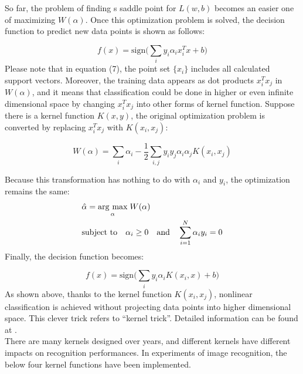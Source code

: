   \noindent So far, the problem of finding s saddle point for $L(w, b)$ becomes an easier one of maximizing $W(\alpha)$. Once this optimization problem is solved, the decision function to predict new data points is shown as follows:

  \begin{equation}
  f(x) = \text{sign}\bigg(\sum_i y_i \alpha_i x_i^T x + b\bigg)
  \end{equation}
  Please note that in equation (7), the point set $\{x_i\}$ includes all calculated support vectors. Moreover, the training data appears as dot products $x_i^T x_j$ in $W(\alpha)$, and it means that classification could be done in higher or even infinite dimensional space by changing $x_i^T x_j$ into other forms of kernel function. Suppose there is a kernel function $K(x, y)$, the original optimization problem is converted by replacing $x_i^T x_j$ with $K(x_i, x_j)$:

  \begin{equation}
  W(\alpha) = \sum_i \alpha_i - \frac{1}{2} \sum_{i,j} y_i y_j \alpha_i \alpha_j K(x_i, x_j)
  \end{equation}

  \noindent Because this transformation has nothing to do with $\alpha_i$ and $y_i$, the optimization remains the same:
  \begin{eqnarray}
  & \hat{\alpha} = \underset{\alpha}{\operatorname{arg}\,\operatorname{max}}\; W(\alpha) \nonumber\\
  & \text{subject to} \quad \alpha_i \ge 0  \quad \text{and} \quad \sum_{i=1}^{N} \alpha_i y_i = 0
  \end{eqnarray}
  Finally, the decision function becomes:

  \begin{equation}
  f(x) = \text{sign}\bigg(\sum_i y_i \alpha_i K(x_i,x) + b\bigg)
  \end{equation}
  As shown above, thanks to the kernel function $K(x_i, x_j)$, nonlinear classification is achieved without projecting data points into higher dimensional space. This clever trick refers to ``kernel trick''. Detailed information can be found at \cite{burges1998tutorial}. \\

  \noindent There are many kernels designed over years, and different kernels have different impacts on recognition performances. In experiments of image recognition, the below four kernel functions have been implemented.
  
